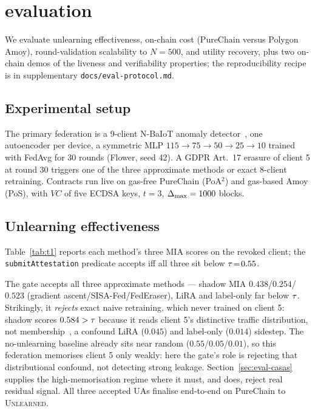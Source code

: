 
\vspace{-0.2cm}
\section{evaluation}
\label{sec:evaluation}

We evaluate unlearning effectiveness, on-chain cost (PureChain versus
Polygon Amoy), round-validation scalability to $N\!=\!500$, and utility
recovery, plus two on-chain demos of the liveness and verifiability
properties; the reproducibility recipe is in supplementary
\texttt{docs/eval-protocol.md}.

\subsection{Experimental setup}
\label{sec:eval-setup}

The primary federation is a 9-client N-BaIoT anomaly
detector~\cite{meidan2018nbaiot}, one autoencoder per device, a
symmetric MLP $115\!\to\!75\!\to\!50\!\to\!25\!\to\!10$ trained with
FedAvg for 30 rounds (Flower, seed 42). A GDPR Art.~17 erasure of client
5 at round 30 triggers one of the three approximate methods or exact
8-client retraining. Contracts run live on gas-free PureChain (PoA$^2$)
and gas-based Amoy (PoS), with $\mathit{VC}$ of five ECDSA keys, $t=3$,
$\Delta_{\max}=1000$ blocks.

\subsection{Unlearning effectiveness}
\label{sec:eval-unlearning}

Table~\ref{tab:t1} reports each method's three MIA scores on the
revoked client; the \texttt{submitAttestation} predicate accepts iff
all three sit below $\tau\!=\!0.55$.

\begin{table}[!htbp]
\centering
\caption{Unlearning effectiveness: MIA scores on the revoked
client's data, post-unlearning. The gate accepts iff all three are
below $\tauMIA = 0.55$.}
\vspace{-0.3cm}
\label{tab:t1}
\footnotesize
\setlength{\tabcolsep}{4pt}
\resizebox{\columnwidth}{!}{}
\end{table}

The gate accepts all three approximate methods --- shadow MIA
$0.438$/$0.254$/$0.523$ (gradient ascent/SISA-Fed/FedEraser), LiRA and
label-only far below $\tau$. Strikingly, it \emph{rejects} exact
naive retraining, which never trained on client 5: shadow scores
$0.584>\tau$ because it reads client 5's distinctive traffic
distribution, not membership~\cite{shokri2017mia}, a confound LiRA
($0.045$) and label-only ($0.014$) sidestep. The no-unlearning baseline
already sits near random ($0.55$/$0.05$/$0.01$), so this federation
memorises client 5 only weakly: here the gate's role is rejecting that
distributional confound, not detecting strong leakage.
Section~\ref{sec:eval-casas} supplies the high-memorisation regime where
it must, and does, reject real residual signal. All three accepted UAs
finalise end-to-end on PureChain to \textsc{Unlearned}.

